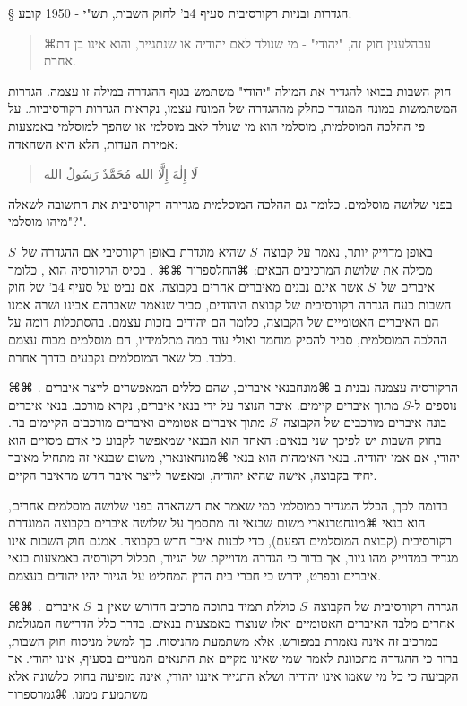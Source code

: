 § הגדרות ובניות רקורסיבית
סעיף 4ב' לחוק השבות, תש"י - 1950 קובע:
\begin{quote}
⌘עבה{לענין חוק זה, "יהודי" - מי שנולד לאם יהודיה או שנתגייר, והוא אינו בן דת אחרת}.
\end{quote}
חוק השבות בבואו להגדיר את המילה "יהודי" משתמש בגוף ההגדרה במילה זו עצמה. הגדרות המשתמשות במונח המוגדר כחלק מההגדרה של המונח עצמו, נקראות הגדרות רקורסיביות. על פי ההלכה המוסלמית, מוסלמי הוא מי שנולד לאב מוסלמי או שהפך למוסלמי באמצעות אמירת העדות, הלא היא השהאדה:
\begin{quote}
\begin{Arabic}
  لَا إِلٰهَ إِلَّا الله مُحَمَّدٌ رَسُولُ الله
  \end{Arabic}
\end{quote}

בפני שלושה מוסלמים. כלומר גם ההלכה המוסלמית מגדירה רקורסיבית את התשובה לשאלה "מיהו מוסלמי?".

באופן מדוייק יותר, נאמר על קבוצה~$S$ שהיא מוגדרת באופן רקורסיבי אם ההגדרה של~$S$ מכילה את שלושת המרכיבים הבאים:
⌘החל{ספרור}
⌘⌘ . בסיס הרקורסיה הוא ,
כלומר איברים של~$S$ אשר אינם נבנים מאיברים אחרים בקבוצה. אם נביט על סעיף 4ב' של
חוק השבות כעח הגדרה רקורסיבית של קבוצת היהודים, סביר שנאמר שאברהם אבינו ושרה
אמנו הם האיברים האטומיים של הקבוצה, כלומר הם יהודים בזכות עצמם. בהסתכלות דומה
על ההלכה המוסלמית, סביר להסיק מוחמד ואולי עוד כמה מתלמידיו, הם מוסלמים מכוח
עצמם בלבד. כל שאר המוסלמים נקבעים בדרך אחרת.

⌘⌘ . הרקורסיה עצמנה נבנית ב ⌘מונח{בנאי איברים}, שהם כללים
המאפשרים לייצר איברים נוספים ל-$S$ מתוך איברים קיימים. איבר הנוצר על ידי בנאי
איברים, נקרא מורכב. בנאי איברים בונה איברים מורכבים של הקבוצה~$S$ מתוך איברים
אטומיים ואיברים מורכבים הקיימים בה. בחוק השבות יש לפיכך שני בנאים: האחד הוא
הבנאי שמאפשר לקבוע כי אדם מסויים הוא יהודי, אם אמו יהודיה. בנאי האימהות הוא
בנאי ⌘מונח{אונארי}, משום שבנאי זה מתחיל מאיבר יחיד בקבוצה, אישה שהיא יהודיה,
ומאפשר לייצר איבר חדש מהאיבר הקיים.

בדומה לכך, הכלל המגדיר כמוסלמי כמי שאמר את השהאדה בפני שלושה מוסלמים אחרים, הוא
בנאי ⌘מונח{טרנארי} משום שבנאי זה מתסמך על שלושה איברים בקבוצה המוגדרת רקורסיבית
(קבוצת המוסלמים הפעם), כדי לבנות איבר חדש בקבוצה. אמנם חוק השבות אינו מגדיר
במדוייק מהו גיור, אך ברור כי הגדרה מדוייקת של הגיור, תכלול רקורסיה באמצעות בנאי
איברים ובפרט, ידרש כי חברי בית הדין המחליט על הגיור יהיו יהודים בעצמם.

⌘⌘ . הגדרה רקורסיבית של הקבוצה~$S$ כוללת תמיד בתוכה מרכיב
הדורש שאין ב~$S$ איברים
אחרים מלבד האיברים האטומיים ואלו שנוצרו באמצעות בנאים. בדרך כלל הדרישה המגולמת במרכיב זה אינה נאמרת במפורש, אלא משתמעת
מהניסוח. כך למשל מניסוח חוק השבות, ברור כי ההגדרה מתכוונת לאמר שמי שאינו מקיים
את התנאים המנויים בסעיף, אינו יהודי. אך הקביעה כי כל מי שאמו אינו יהודיה ושלא
התגייר איננו יהודי, אינה מופיעה בחוק כלשונה אלא משתמעת ממנו.
⌘גמר{ספרור}

